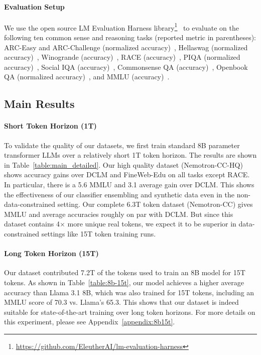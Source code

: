 \documentclass[11pt]{article}
\newcommand{\DCLM}{\textsc{DCLM}\xspace}
\newcommand{\Ours}{Nemotron-CC\xspace}
\begin{document}
\paragraph{Evaluation Setup} We use the open source LM Evaluation Harness library\footnote{\url{https://github.com/EleutherAI/lm-evaluation-harness}}~\citep{eval-harness} to evaluate on the following ten common sense and reasoning tasks (reported metric in parentheses): ARC-Easy and ARC-Challenge (normalized accuracy)~\citep{clark2018think}, Hellaswag (normalized accuracy)~\citep{zellers2019hellaswag}, Winogrande (accuracy)~\citep{sakaguchi2021winogrande}, RACE (accuracy)~\citep{lai2017race}, PIQA (normalized accuracy)~\citep{bisk2020piqa}, Social IQA (accuracy)~\citep{sap2019social}, Commonsense QA (accuracy)~\citep{talmor2019commonsenseqa}, Openbook QA (normalized accuracy)~\citep{mihaylov2018can}, and MMLU (accuracy)~\citep{hendrycks2021measuring}.

\subsection{Main Results}

\paragraph{Short Token Horizon (1T)}

To validate the quality of our datasets, we first train standard 8B parameter transformer LLMs over a relatively short 1T token horizon. The results are shown in Table~\ref{table:main_detailed}. Our high quality dataset (\Ours-HQ) shows accuracy gains over \DCLM and FineWeb-Edu on all tasks except RACE. In particular, there is a 5.6 MMLU and 3.1 average gain over \DCLM. This shows the effectiveness of our classifier ensembling and synthetic data even in the non-data-constrained setting. Our complete 6.3T token dataset (\Ours) gives MMLU and average accuracies roughly on par with \DCLM. But since this dataset contains 4$\times$ more unique real tokens, we expect it to be superior in data-constrained settings like 15T token training runs.

\paragraph{Long Token Horizon (15T)}

Our dataset contributed 7.2T of the tokens used to train an 8B model for 15T tokens.
As shown in Table~\ref{table:8b-15t}, our model achieves a higher average accuracy than Llama 3.1 8B, which was also trained for 15T tokens, including an MMLU score of 70.3 vs. Llama's 65.3. This shows that our dataset is indeed suitable for state-of-the-art training over long token horizons. For more details on this experiment, please see Appendix~\ref{appendix:8b15t}.
\end{document}
